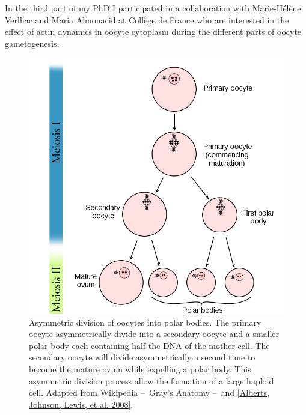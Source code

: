 \documentclass[A4paperpaper,11pt,english]{sphinxmanual}
\begin{document}
In the third part of my PhD I participated in a collaboration with Marie-Hélène
Verlhac and Maria Almonacid at Collège de France who are interested in the
effect of actin dynamics in oocyte cytoplasm during the different parts of
oocyte gametogenesis.
\begin{figure}[htbp]
\centering
\capstart

\includegraphics[width=0.800\linewidth]{oocyte-polar.png}
\caption{Asymmetric division of oocytes into polar bodies. The primary oocyte
asymmetrically divide into a secondary oocyte and a smaller polar body each
containing half the DNA of the mother cell. The secondary oocyte will
divide asymmetrically a second time to become the mature ovum while
expelling a polar body. This asymmetric division process allow the
formation of a large haploid cell. Adapted from Wikipedia – Gray's
Anatomy – and {\hyperref[index-latex:alberts2008]{{[}Alberts, Johnson, Lewis,  et al.  2008{]}}}.}\label{index-latex:fig-asymetric-division}\end{figure}
\end{document}
